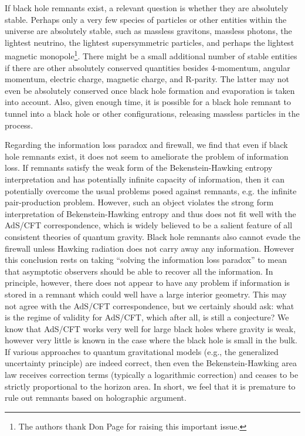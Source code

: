 \documentclass[12pt]{article}
\newcommand{\2}{$^2$}
\newcommand{\3}{$^3$}
\newcommand{\4}{$_4$}
\newcommand{\5}{$_5$}
\begin{document}
{\color{black} If black hole remnants exist, a relevant question is whether they are absolutely stable. Perhaps only a very few species of particles or
other entities within the universe are absolutely stable, such as massless gravitons, massless photons, the lightest neutrino, the lightest supersymmetric
particles, and perhaps the lightest magnetic monopole\footnote{\color{black}The authors thank Don Page for raising this important issue.}. There might be a small additional number of stable entities if there are other
absolutely conserved quantities besides 4-momentum, angular momentum,
electric charge, magnetic charge, and R-parity. The latter may not even be absolutely conserved once black hole formation and evaporation is taken into account. Also, given enough time, it is possible for a black hole remnant to tunnel into a black hole or other configurations, releasing massless particles in the process.}

Regarding the information loss paradox and firewall, we find that even if black hole remnants exist, it does not seem to ameliorate the problem of information loss. If remnants satisfy the weak form of the Bekenstein-Hawking entropy interpretation and has potentially infinite capacity of information, then it can potentially overcome the usual problems posed against remnants, e.g. the infinite pair-production problem. However, such an object violates the strong form interpretation of Bekenstein-Hawking entropy and thus does not fit well with the AdS/CFT correspondence, which is widely believed to be a salient feature of all consistent theories of quantum gravity. Black hole remnants also cannot evade the firewall unless Hawking radiation does not carry away any information.  
However this conclusion rests on taking ``solving the information loss paradox'' to mean that asymptotic observers should be able to recover all the information. In principle, however, there does not appear to have any problem if information is stored in a remnant which could well have a large interior geometry. This may not agree with the AdS/CFT correspondence, but we certainly should ask: what is the regime of validity for AdS/CFT, which after all, is still a conjecture? We know that AdS/CFT works very well for large black holes where gravity is weak, however very little is known in the case where the black hole is small in the bulk. If various approaches to quantum gravitational models (e.g., the generalized uncertainty principle) are indeed correct, then even the Bekenstein-Hawking area law receives correction terms (typically a logarithmic correction) and ceases to be strictly proportional to the horizon area. In short, we feel that it is premature to rule out remnants based on holographic argument. 
\end{document}
